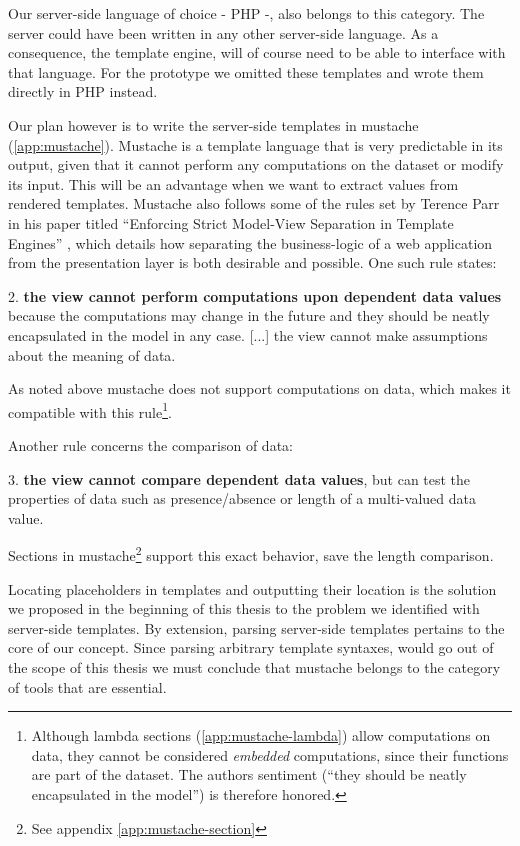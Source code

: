 \documentclass[thesis.tex]{subfiles}
\begin{document}
Our server-side language of choice - PHP -, also belongs to this category.
The server could have been written in any other server-side language.
As a consequence, the template engine, will of course need to be
able to interface with that language. For the prototype we omitted these
templates and wrote them directly in PHP instead.

Our plan however is to write the server-side templates in mustache
(\ref{app:mustache}). Mustache is a template language that is very
predictable in its output, given that it cannot perform any computations on the
dataset or modify its input. This will be an advantage when we want to extract
values from rendered templates. Mustache also follows some of the rules set by
Terence Parr in his paper titled ``Enforcing Strict Model-View Separation in
Template Engines'' \cite{STRINGTPL}, which details how separating the
business-logic of a web application from the presentation layer is both
desirable and possible. One such rule states:
\begin{citequote}{\cite[Chapter 7]{STRINGTPL}}
	2. \textbf{the view cannot perform computations upon dependent data values}
	because the computations may change in the future and
	they should be neatly encapsulated in the model in any case.
	[...] the view cannot make assumptions about the meaning of data.
\end{citequote}
As noted above mustache does not support computations on data, which makes it
compatible with this rule\footnote{Although lambda sections
(\ref{app:mustache-lambda}) allow computations on data,
they cannot be considered \emph{embedded} computations,
since their functions are part of the dataset.
The authors sentiment (``they should be neatly encapsulated in the model'')
is therefore honored.}.

Another rule concerns the comparison of data:
\begin{citequote}{\cite[Chapter 7]{STRINGTPL}}
	3. \textbf{the view cannot compare dependent data values},
	but can test the properties of data such as presence/absence
	or length of a multi-valued data value.
\end{citequote}
Sections in mustache\footnote{See appendix \ref{app:mustache-section}} support
this exact behavior, save the length comparison.

Locating placeholders in templates and outputting their location is the solution
we proposed in the beginning of this thesis to the problem we identified with
server-side templates.
By extension, parsing server-side templates pertains to the core of our concept.
Since parsing arbitrary template syntaxes, would go out of the scope of this
thesis we must conclude that mustache belongs to the category of tools that
are essential.
\end{document}
